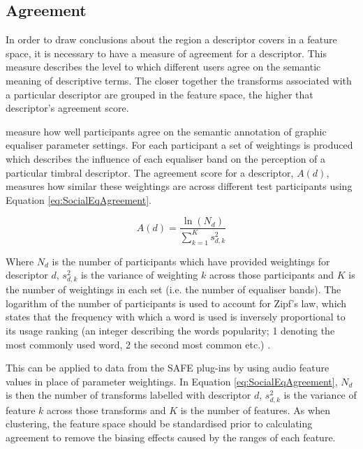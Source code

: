 	\subsection{Agreement}
	\label{sec:TimbreEvaluation-Analysis-Agreement}
		In order to draw conclusions about the region a descriptor covers in a feature space, it is necessary to
		have a measure of agreement for a descriptor. This measure describes the level to which different users
		agree on the semantic meaning of descriptive terms. The closer together the transforms associated with a
		particular descriptor are grouped in the feature space, the higher that descriptor's agreement score.

		\citet{cartwright2013socialeq} measure how well participants agree on the semantic annotation of graphic
		equaliser parameter settings. For each participant a set of weightings is produced which describes the
		influence of each equaliser band on the perception of a particular timbral descriptor. The agreement score
		for a descriptor, $A(d)$, measures how similar these weightings are across different test participants
		using Equation \ref{eq:SocialEqAgreement}.

		\begin{equation}
			A(d) = \frac{\ln(N_{d})}{\sum_{k = 1}^{K} s_{d,k}^{2}}
			\label{eq:SocialEqAgreement}
		\end{equation}

		Where $N_{d}$ is the number of participants which have provided weightings for descriptor $d$,
		$s_{d,k}^{2}$ is the variance of weighting $k$ across those participants and $K$ is the number of
		weightings in each set (i.e. the number of equaliser bands). The logarithm of the number of
		participants is used to account for Zipf's law, which states that the frequency with which a word is used
		is inversely proportional to its usage ranking (an integer describing the words popularity; 1 denoting the
		most commonly used word, 2 the second most common etc.) \citep{manning1999foundations}.

		This can be applied to data from the SAFE plug-ins by using audio feature values in place of parameter
		weightings. In Equation \ref{eq:SocialEqAgreement}, $N_{d}$ is then the number of transforms labelled with
		descriptor $d$, $s_{d,k}^{2}$ is the variance of feature $k$ across those transforms and $K$ is the
		number of features. As when clustering, the feature space should be standardised prior to calculating
		agreement to remove the biasing effects caused by the ranges of each feature.

